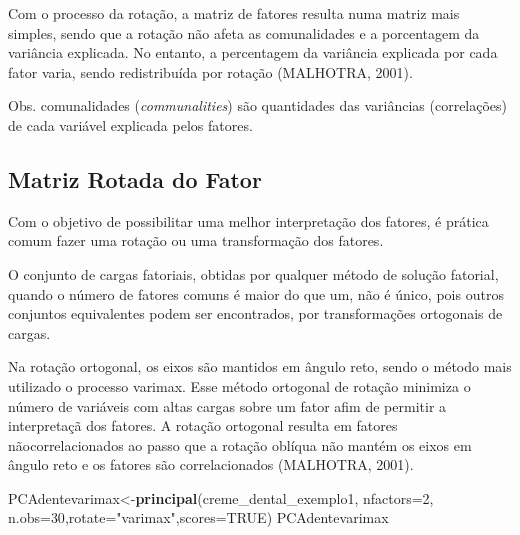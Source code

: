 \documentclass[12pt,brazil,oneside]{book}
\newenvironment{Shaded}{\begin{snugshade}}{\end{snugshade}}
\newcommand{\DataTypeTok}[1]{\textcolor[rgb]{0.13,0.29,0.53}{#1}}
\newcommand{\DecValTok}[1]{\textcolor[rgb]{0.00,0.00,0.81}{#1}}
\newcommand{\KeywordTok}[1]{\textcolor[rgb]{0.13,0.29,0.53}{\textbf{#1}}}
\newcommand{\NormalTok}[1]{#1}
\newcommand{\OtherTok}[1]{\textcolor[rgb]{0.56,0.35,0.01}{#1}}
\newcommand{\StringTok}[1]{\textcolor[rgb]{0.31,0.60,0.02}{#1}}
\begin{document}
Com o processo da rotação, a matriz de fatores resulta numa matriz mais
simples, sendo que a rotação não afeta as comunalidades e a porcentagem
da variância explicada. No entanto, a percentagem da variância explicada
por cada fator varia, sendo redistribuída por rotação (MALHOTRA, 2001).

Obs. comunalidades (\emph{communalities}) são quantidades das variâncias
(correlações) de cada variável explicada pelos fatores.

\hypertarget{matriz-rotada-do-fator}{%
\subsection{Matriz Rotada do Fator}\label{matriz-rotada-do-fator}}

Com o objetivo de possibilitar uma melhor interpretação dos fatores, é
prática comum fazer uma rotação ou uma transformação dos fatores.

O conjunto de cargas fatoriais, obtidas por qualquer método de solução
fatorial, quando o número de fatores comuns é maior do que um, não é
único, pois outros conjuntos equivalentes podem ser encontrados, por
transformações ortogonais de cargas.

Na rotação ortogonal, os eixos são mantidos em ângulo reto, sendo o
método mais utilizado o processo varimax. Esse método ortogonal de
rotação minimiza o número de variáveis com altas cargas sobre um fator
afim de permitir a interpretaçã dos fatores. A rotação ortogonal resulta
em fatores nãocorrelacionados ao passo que a rotação oblíqua não mantém
os eixos em ângulo reto e os fatores são correlacionados (MALHOTRA,
2001).

\begin{Shaded}
\begin{Highlighting}[]
\NormalTok{PCAdentevarimax<-}\KeywordTok{principal}\NormalTok{(creme_dental_exemplo1, }\DataTypeTok{nfactors=}\DecValTok{2}\NormalTok{,}
            \DataTypeTok{n.obs=}\DecValTok{30}\NormalTok{,}\DataTypeTok{rotate=}\StringTok{"varimax"}\NormalTok{,}\DataTypeTok{scores=}\OtherTok{TRUE}\NormalTok{)}
\NormalTok{PCAdentevarimax}
\end{Highlighting}
\end{Shaded}
\end{document}
